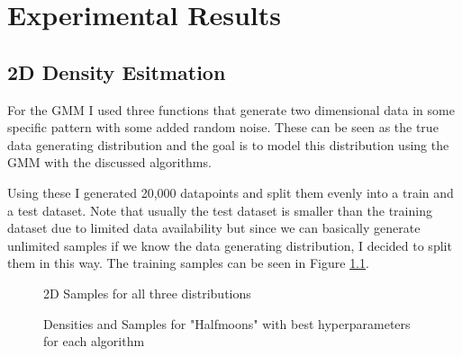 \chapter{Experimental Results}
\label{cha:experimental_results}

\section{2D Density Esitmation}

For the GMM I used three functions that generate two dimensional data in some specific pattern with some added random noise. These 
can be seen as the true data generating distribution and the goal is to model this distribution using the GMM with the discussed 
algorithms. 

Using these I generated 20,000 datapoints and split them evenly into a train and a test dataset. Note that usually the test dataset is smaller 
than the training dataset due to limited data availability but since we can basically generate unlimited samples if we know 
the data generating distribution, I decided to split them in this way. 
The training samples can be seen in Figure \ref{fig:2d_datasets}. \\

\begin{figure}[h]
    \centering
    \caption{2D Samples for all three distributions}
    \label{fig:2d_datasets}
\end{figure}

\begin{figure}[H]
    \centering
    \caption{Densities and Samples for "Halfmoons" with best hyperparameters for each algorithm}
    \label{fig:moons_best}
\end{figure}

